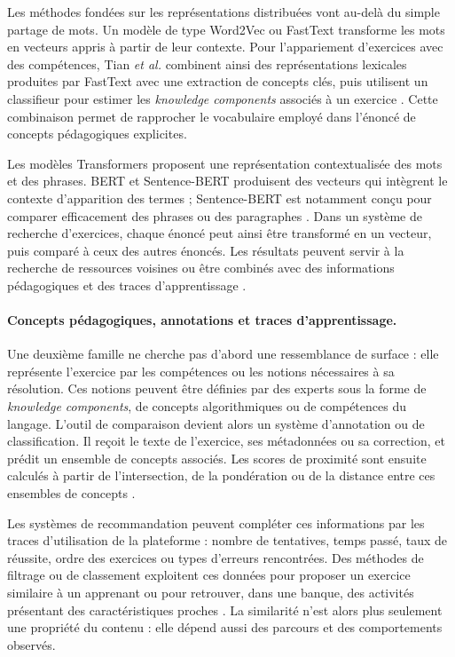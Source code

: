 \documentclass[12pt,a4paper,oneside]{report}
\begin{document}
Les méthodes fondées sur les représentations distribuées vont au-delà du
simple partage de mots. Un modèle de type Word2Vec ou FastText transforme les
mots en vecteurs appris à partir de leur contexte. Pour l'appariement
d'exercices avec des compétences, Tian \emph{et al.} combinent ainsi des
représentations lexicales produites par FastText avec une extraction de
concepts clés, puis utilisent un classifieur pour estimer les
\emph{knowledge components} associés à un exercice
\cite{tian_2022}. Cette combinaison permet de rapprocher le vocabulaire
employé dans l'énoncé de concepts pédagogiques explicites.

Les modèles Transformers proposent une représentation contextualisée des
mots et des phrases. BERT et Sentence-BERT produisent des vecteurs qui
intègrent le contexte d'apparition des termes ; Sentence-BERT est notamment
conçu pour comparer efficacement des phrases ou des paragraphes
\cite{reimers_sentence-bert_2019}. Dans un système de recherche d'exercices, chaque énoncé
peut ainsi être transformé en un vecteur, puis comparé à ceux des
autres énoncés. Les résultats peuvent servir à la recherche de ressources
voisines ou être combinés avec des informations pédagogiques et des traces
d'apprentissage \cite{liu_2018,pelanek_2020}.

\paragraph{Concepts pédagogiques, annotations et traces d'apprentissage.}

Une deuxième famille ne cherche pas d'abord une ressemblance de surface :
elle représente l'exercice par les compétences ou les notions nécessaires à
sa résolution. Ces notions peuvent être définies par des experts sous la
forme de \emph{knowledge components}, de concepts algorithmiques ou de
compétences du langage. L'outil de comparaison devient alors un système
d'annotation ou de classification. Il reçoit le texte de l'exercice, ses
métadonnées ou sa correction, et prédit un ensemble de concepts associés.
Les scores de proximité sont ensuite calculés à partir de l'intersection,
de la pondération ou de la distance entre ces ensembles de concepts
\cite{tian_2022,hosseini_2017}.

Les systèmes de recommandation peuvent compléter ces informations par les
traces d'utilisation de la plateforme : nombre de tentatives, temps passé,
taux de réussite, ordre des exercices ou types d'erreurs rencontrées. Des
méthodes de filtrage ou de classement exploitent ces données pour proposer
un exercice similaire à un apprenant ou pour retrouver, dans une banque,
des activités présentant des caractéristiques proches
\cite{liu_2018}. La similarité n'est alors plus seulement une propriété du
contenu : elle dépend aussi des parcours et des comportements observés.
\end{document}
